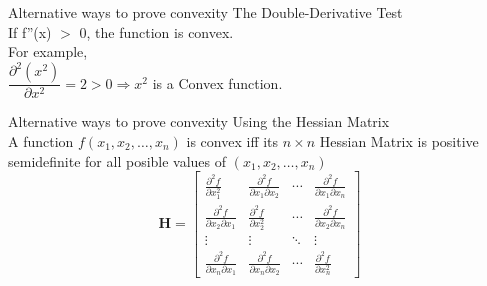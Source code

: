 \documentclass{beamer}
\begin{document}
	\begin{frame}{Alternative ways to prove convexity}
	The Double-Derivative Test\\
	\vspace{1cm}
	If f''(x) $>$ 0, the function is  convex.\\
	\vspace{1cm}
	For example,\\
	\vspace{1cm}
	$\dfrac{\partial ^2( x^2)}{\partial x^2} = 2 > 0 \Rightarrow x^2$ is a Convex function.\\  
	\end{frame}

	\begin{frame}{Alternative ways to prove convexity}
	Using the Hessian Matrix\\
	\vspace{1cm}
	A function $f(x_1,x_2,\dots,x_n)$ is convex iff its $n \times n$ Hessian Matrix is positive semidefinite for all posible values of $(x_1,x_2,\dots, x_n)$\\
	\begin{equation*}
\mathbf{H}=\left[\begin{array}{cccc}
{\frac{\partial^{2} f}{\partial x_{1}^{2}}} & {\frac{\partial^{2} f}{\partial x_{1} \partial x_{2}}} & {\cdots} & {\frac{\partial^{2} f}{\partial x_{1} \partial x_{n}}} \\
{\frac{\partial^{2} f}{\partial x_{2} \partial x_{1}}} & {\frac{\partial^{2} f}{\partial x_{2}^{2}}} & {\cdots} & {\frac{\partial^{2} f}{\partial x_{2} \partial x_{n}}} \\
{\vdots} & {\vdots} & {\ddots} & {\vdots} \\
{\frac{\partial^{2} f}{\partial x_{n} \partial x_{1}}} & {\frac{\partial^{2} f}{\partial x_{n} \partial x_{2}}} & {\cdots} & {\frac{\partial^{2} f}{\partial x_{n}^{2}}}
\end{array}\right]
\end{equation*}
	\end{frame}
\end{document}
